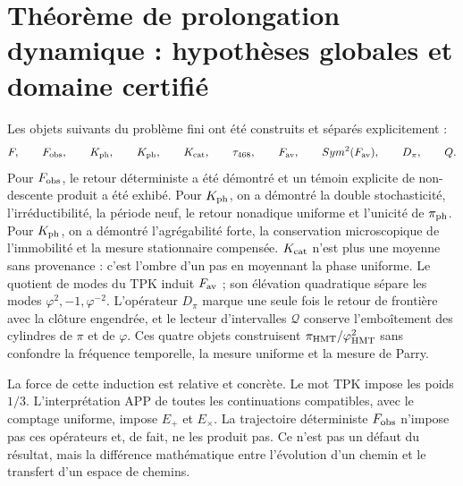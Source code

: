 \section{Théorème de prolongation dynamique : hypothèses globales et domaine certifié}

Les objets suivants du problème fini ont été construits et séparés
explicitement :
\[
 F,
 \qquad
 F_{\rm obs},
 \qquad
 \mathcal K_{\rm ph},
 \qquad
 \widehat{\mathcal K}_{\rm ph},
 \qquad
 K_{\rm cat},
 \qquad
 \tau_{468},
 \qquad
 F_{\rm av},
 \qquad
 \operatorname{Sym}^2(F_{\rm av}),
 \qquad
 D_\pi,
 \qquad
 \mathcal Q.
\]
Pour \(F_{\rm obs}\), le retour déterministe a été démontré et un
témoin explicite de non-descente produit a été exhibé. Pour \(\mathcal K_{\rm ph}\), on a
démontré la double stochasticité, l'irréductibilité, la période neuf, le
retour nonadique uniforme et l'unicité de
\(\pi_{\rm ph}\). Pour \(\widehat{\mathcal K}_{\rm ph}\), on a démontré
l'agrégabilité forte, la conservation microscopique de l'immobilité et la mesure
stationnaire compensée. \(K_{\rm cat}\) n'est plus une moyenne sans
provenance : c'est l'ombre d'un pas en moyennant la phase uniforme.
Le quotient de modes du TPK induit \(F_{\rm av}\) ; son élévation quadratique
sépare les modes \(\varphi^2,-1,\varphi^{-2}\). L'opérateur \(D_\pi\)
marque une seule fois le retour de frontière avec la clôture engendrée, et le
lecteur d'intervalles \(\mathcal Q\) conserve l'emboîtement des cylindres de
\(\pi\) et de \(\varphi\). Ces quatre objets construisent
\(\pi_{\rm HMT}/\varphi_{\rm HMT}^2\) sans confondre la fréquence temporelle,
la mesure uniforme et la mesure de Parry.

La force de cette induction est relative et concrète. Le mot TPK impose les
poids \(1/3\). L'interprétation APP de toutes les continuations compatibles,
avec le comptage uniforme, impose \(E_+\) et \(E_\times\). La trajectoire
déterministe \(F_{\rm obs}\) n'impose pas ces opérateurs et, de fait, ne les
produit pas. Ce n'est pas un défaut du résultat, mais la différence mathématique
entre l'évolution d'un chemin et le transfert d'un espace de chemins.

